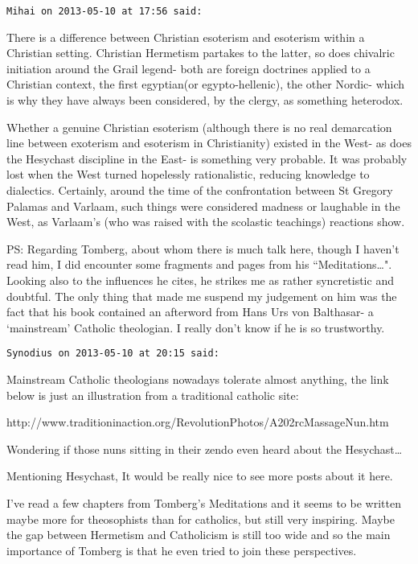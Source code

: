 \begin{footnotesize}
\begin{sffamily}
\texttt{Mihai on 2013-05-10 at 17:56 said: }

There is a difference between Christian esoterism and esoterism within a Christian setting. Christian Hermetism partakes to the latter, so does chivalric initiation around the Grail legend- both are foreign doctrines applied to a Christian context, the first egyptian(or egypto-hellenic), the other Nordic- which is why they have always been considered, by the clergy, as something heterodox. 

Whether a genuine Christian esoterism (although there is no real demarcation line between exoterism and esoterism in Christianity) existed in the West- as does the Hesychast discipline in the East- is something very probable. It was probably lost when the West turned hopelessly rationalistic, reducing knowledge to dialectics. Certainly, around the time of the confrontation between St Gregory Palamas and Varlaam, such things were considered madness or laughable in the West, as Varlaam's (who was raised with the scolastic teachings) reactions show. 

PS: Regarding Tomberg, about whom there is much talk here, though I haven't read him, I did encounter some fragments and pages from his ``Meditations…". Looking also to the influences he cites, he strikes me as rather syncretistic and doubtful. The only thing that made me suspend my judgement on him was the fact that his book contained an afterword from Hans Urs von Balthasar- a `mainstream' Catholic theologian. I really don't know if he is so trustworthy.


\hfill

\texttt{Synodius on 2013-05-10 at 20:15 said: }

Mainstream Catholic theologians nowadays tolerate almost anything, the link below is just an illustration from a traditional catholic site:

http://www.traditioninaction.org/RevolutionPhotos/A202rcMassageNun.htm

Wondering if those nuns sitting in their zendo even heard about the Hesychast…

Mentioning Hesychast, It would be really nice to see more posts about it here. 

I've read a few chapters from Tomberg's Meditations and it seems to be written maybe more for theosophists than for catholics, but still very inspiring. Maybe the gap between Hermetism and Catholicism is still too wide and so the main importance of Tomberg is that he even tried to join these perspectives.



\end{sffamily}
\end{footnotesize}
